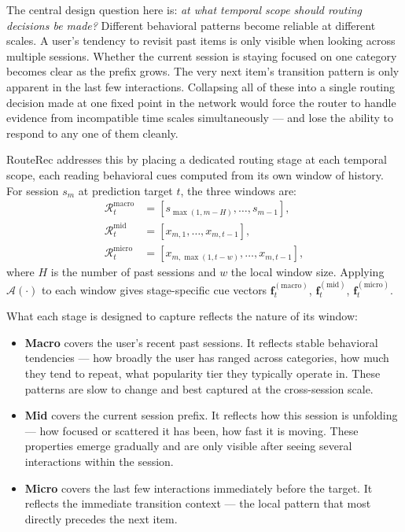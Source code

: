 \documentclass[sigconf,review,anonymous]{acmart}
\begin{document}
The central design question here is: \emph{at what temporal scope should routing decisions be made?} Different behavioral patterns become reliable at different scales. A user's tendency to revisit past items is only visible when looking across multiple sessions. Whether the current session is staying focused on one category becomes clear as the prefix grows. The very next item's transition pattern is only apparent in the last few interactions. Collapsing all of these into a single routing decision made at one fixed point in the network would force the router to handle evidence from incompatible time scales simultaneously --- and lose the ability to respond to any one of them cleanly.

RouteRec addresses this by placing a dedicated routing stage at each temporal scope, each reading behavioral cues computed from its own window of history. For session $s_m$ at prediction target $t$, the three windows are:
\begin{align}
\mathcal{R}^{\mathrm{macro}}_t &= [s_{\max(1,m-H)},\dots,s_{m-1}], \\
\mathcal{R}^{\mathrm{mid}}_t   &= [x_{m,1},\dots,x_{m,t-1}], \\
\mathcal{R}^{\mathrm{micro}}_t &= [x_{m,\max(1,t-w)},\dots,x_{m,t-1}],
\end{align}
where $H$ is the number of past sessions and $w$ the local window size. Applying $\mathcal{A}(\cdot)$ to each window gives stage-specific cue vectors $\mathbf{f}^{(\mathrm{macro})}_t$, $\mathbf{f}^{(\mathrm{mid})}_t$, $\mathbf{f}^{(\mathrm{micro})}_t$.

What each stage is designed to capture reflects the nature of its window:
\begin{itemize}
  \item \textbf{Macro} covers the user's recent past sessions. It reflects stable behavioral tendencies --- how broadly the user has ranged across categories, how much they tend to repeat, what popularity tier they typically operate in. These patterns are slow to change and best captured at the cross-session scale.
  \item \textbf{Mid} covers the current session prefix. It reflects how this session is unfolding --- how focused or scattered it has been, how fast it is moving. These properties emerge gradually and are only visible after seeing several interactions within the session.
  \item \textbf{Micro} covers the last few interactions immediately before the target. It reflects the immediate transition context --- the local pattern that most directly precedes the next item.
\end{itemize}
\end{document}
